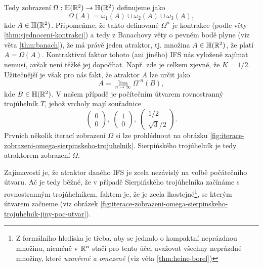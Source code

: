 Tedy zobrazení $\Omega:\mathbb{H}(\mathbb{R}^2) \rightarrow \mathbb{H}(\mathbb{R}^2)$ definujeme jako
\[\Omega(A)=\omega_1(A)\cup\omega_2(A)\cup\omega_3(A),\]
kde $A\in\mathbb{H}(\mathbb{R}^2)$. Připomeňme, že takto definované $\Omega^n$ je kontrakce (podle věty \ref{thm:sjednoceni-kontrakci}) a tedy z Banachovy věty o pevném bodě plyne (viz věta \ref{thm:banach}), že má právě jeden atraktor, tj. množina $A\in\mathbb{H}(\mathbb{R}^2)$, že platí $A=\Omega(A)$. Kontraktivní faktor tohoto (ani jiného) IFS nás vyloženě zajímat nemusí, avšak není těžké jej dopočítat. Např. zde je celkem zjevné, že $K=1/2$. Užitečnější je však pro nás fakt, že atraktor $A$ lze určit jako
\[A=\lim_{n\to\infty}\Omega^{\circ n}(B),\]
kde $B\in\mathbb{H}(\mathbb{R}^2)$. V našem případě je počítečním útvarem rovnostranný trojúhelník $T$, jehož vrcholy mají souřadnice
\[\left(\begin{matrix}
    0\\
    0
\end{matrix}\right),\;\left(\begin{matrix}
    1\\
    0
\end{matrix}\right),\;\left(\begin{matrix}
    1/2\\
    \sqrt{3}/2
\end{matrix}\right).\]
Prvních několik iterací zobrazení $\Omega$ si lze prohlédnout na obrázku \ref{fig:iterace-zobrazeni-omega-sierpinskeho-trojuhelnik}. Sierpińského trojúhelník je tedy atraktorem zobrazení $\Omega$.

Zajímavostí je, že atraktor daného IFS je zcela nezávislý na volbě počátečního útvaru. Ač je tedy běžné, že v případě Sierpińského trojúhelníka začínáme s rovnostranným trojúhelníkem, faktem je, že je zcela lhostejné\footnote{Z formálního hlediska je třeba, aby se jednalo o kompaktní neprázdnou množinu, nicméně v $\mathbb{R}^n$ stačí pro tento účel uvažovat všechny neprázdné množiny, které \emph{uzavřené a omezené} (viz věta \ref{thm:heine-borel})}, se kterým útvarem začneme (viz obrázek \ref{fig:iterace-zobrazeni-omega-sierpinskeho-trojuhelnik-jiny-poc-utvar}).

